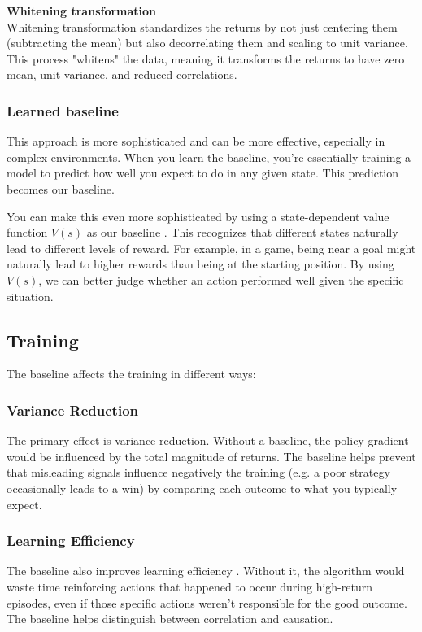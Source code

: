\documentclass{article}
\begin{document}
\textbf{Whitening transformation} \\
Whitening transformation \cite{baseline_learning} standardizes the returns by not just centering them (subtracting the mean) but also decorrelating them and scaling to unit variance. This process "whitens" the data, meaning it transforms the returns to have zero mean, unit variance, and reduced correlations.

\subsubsection{Learned baseline}
This approach is more sophisticated and can be more effective, especially in complex environments. When you learn the baseline, you're essentially training a model to predict how well you expect to do in any given state. This prediction becomes our baseline.

You can make this even more sophisticated by using a state-dependent value function $V(s)$ as our baseline \cite{baseline}. This recognizes that different states naturally lead to different levels of reward. For example, in a game, being near a goal might naturally lead to higher rewards than being at the starting position. By using $V(s)$, we can better judge whether an action performed well given the specific situation.

\subsection{Training}
The baseline affects the training in different ways:

\subsubsection{Variance Reduction}
The primary effect is variance reduction. Without a baseline, the policy gradient would be influenced by the total magnitude of returns. The baseline helps prevent that misleading signals influence negatively the training (e.g. a poor strategy occasionally leads to a win) by comparing each outcome to what you typically expect.

\subsubsection{Learning Efficiency}
The baseline also improves learning efficiency \cite{baseline_learning}. Without it, the algorithm would waste time reinforcing actions that happened to occur during high-return episodes, even if those specific actions weren't responsible for the good outcome. The baseline helps distinguish between correlation and causation.
\end{document}
